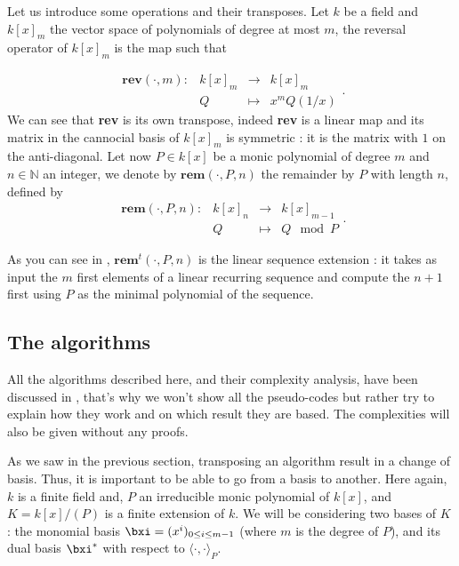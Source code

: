 \documentclass[a4paper,11pt]{article}
\theoremstyle{break}
\theoremstyle{definition}
\theoremstyle{remark}
\newcommand{\ps}[2]{\langle#1,#2\rangle}
\newcommand{\psdot}{\ps{\cdot}{\cdot}}
\begin{document}
Let us introduce some operations and their transposes. Let $k$ be a field and 
$k[x]_m$ the vector space of polynomials of degree at most $m$, the reversal 
operator of $k[x]_m$ is the map such that

\[  
\begin{array}{rccc}
  \textbf{rev}(\cdot,m): & k[x]_m & \to & k[x]_m \\
   & Q & \mapsto & x^mQ(1/x)
\end{array}.
\]
We can see that \textbf{rev} is its own transpose, indeed \textbf{rev} is a 
linear map and its matrix in the cannocial basis of $k[x]_m$ is symmetric : it 
is the matrix with $1$ on the anti-diagonal. Let now $P\in k[x]$ be a monic 
polynomial of degree $m$ and $n\in\mathbb{N}$ an integer, we denote by 
$\textbf{rem}(\cdot,P,n)$ the remainder by $P$ with length $n$, defined by 
\[  
\begin{array}{rccc}
  \textbf{rem}(\cdot,P,n): & k[x]_n & \to & k[x]_{m-1} \\
   & Q & \mapsto & Q\mod P
\end{array}.
\]

As you can see in \cite{BoLeSc03}, $\textbf{rem}^t(\cdot,P,n)$ is the linear 
sequence extension : it takes as input the $m$ first elements of a linear 
recurring sequence and compute the $n+1$ first using $P$ as the minimal 
polynomial of the sequence.

\subsection{The algorithms}
\label{sec-algo}
All the algorithms described here, and their complexity analysis, have been
discussed in \cite{DeDoSc14}, that's why we won't show all the pseudo-codes but
rather try to explain how they work and on which result they are based. The 
complexities will also be given without any proofs. 

As we saw in the previous section, transposing an algorithm result in a change
of basis. Thus, it is important to be able to go from a basis to another. Here
again, $k$ is a finite field and, $P$ an irreducible monic polynomial of $k[x]$, 
and
$K=k[x]/(P)$ is a finite extension of $k$. We will be considering two bases of
$K$ : the monomial basis $\bxi=(x^i)_{0\leq i \leq m-1}$ (where $m$ is the
degree of $P$), and its dual basis $\bxi^*$ with respect to $\psdot_P$.
\end{document}
